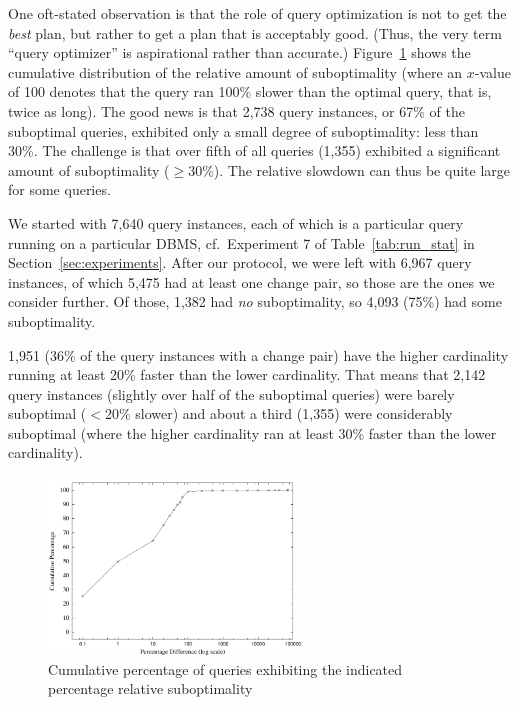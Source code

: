 \documentclass[prodmode,acmtods]{acmsmall}
\begin{document}
One oft-stated observation is that the role of query optimization is not to
get the {\em best} plan, but rather to get a plan that is acceptably
good. (Thus, the very term ``query optimizer'' is aspirational rather than
accurate.) Figure~\ref{fig:suboptcumulative} shows
the cumulative distribution of the relative amount of suboptimality (where
an $x$-value of 100 denotes that the query ran 100\% slower than the optimal
query, that is, twice as long). The good news is that 2,738 query instances,
or 67\% of the suboptimal queries, exhibited only a small degree of
suboptimality: less than 30\%. The challenge is that over fifth of all
queries (1,355) exhibited a significant amount of suboptimality ($\geq
30\%$). The relative slowdown can thus be quite large for some queries.

We started with 7,640 query instances, each of which is a particular query running on a
particular DBMS, cf.~Experiment 7 of Table~\ref{tab:run_stat}
in Section~\ref{sec:experiments}. After our protocol, we were left with
  6,967 query instances, of which 5,475 had at least one change pair, so those are
  the ones we consider further. Of those, 1,382 had {\em no} suboptimality, so
4,093 (75\%) had some suboptimality. 

1,951 (36\% of the query instances with a change pair) have the higher cardinality
running at least 20\% faster than the lower cardinality. That means that
2,142 query instances (slightly over half of the suboptimal queries) were barely
suboptimal ($<$20\% slower) and about a third (1,355) were considerably
suboptimal (where the higher cardinality ran at least 30\% faster than the
lower cardinality).

\begin{figure}\centering
\includegraphics[width=0.60\textwidth]{figures/rel_diff.pdf}
\caption{Cumulative percentage of queries exhibiting the \hbox{indicated}
  percentage relative suboptimality\label{fig:suboptcumulative}}
\end{figure}
\end{document}
